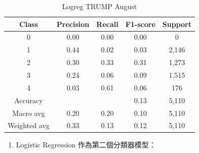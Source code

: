 \begin{enumerate}
\begin{table}[H]
        \vspace{1em} %
        
        \scriptsize
        \begin{tabular}{c|cccc}
        \hline
        Class & Precision & Recall & F1-score & Support \\
        \hline
        0 & 0.00 & 0.00 & 0.00 & 0 \\
        1 & 0.44 & 0.02 & 0.03 & 2,146 \\
        2 & 0.30 & 0.33 & 0.31 & 1,273 \\
        3 & 0.24 & 0.06 & 0.09 & 1,515 \\
        4 & 0.03 & 0.61 & 0.06 & 176 \\
        \hline
        Accuracy &       &      & 0.13 & 5,110 \\
        Macro avg & 0.20 & 0.20 & 0.10 & 5,110 \\
        Weighted avg & 0.33 & 0.13 & 0.12 & 5,110 \\
        \hline
        \end{tabular}
        \caption{Logreg TRUMP August}
        \label{tab:classifier_1_report_logreg_trump_non_filtered_aug}
        \end{table}

        \pagebreak

            \begin{enumerate}
                \item Logistic Regression 作為第二個分類器模型：


\end{enumerate}
\end{enumerate}
